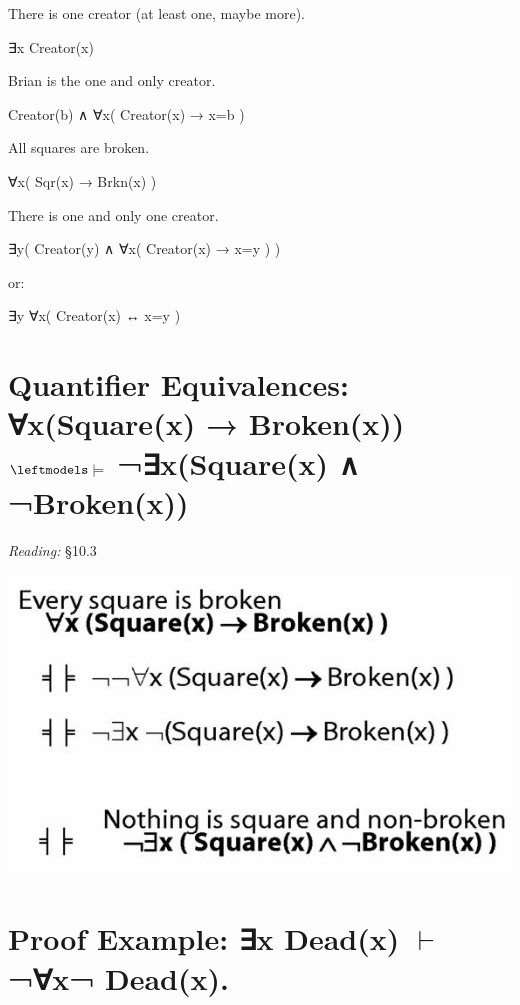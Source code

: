 \documentclass[12pt]{extarticle}
\begin{document}
\begin{multicols*}{3}
There is one creator (at least one, maybe more).
 
\hspace{3mm} ∃x Creator(x)
 
Brian is the one and only creator.
 
\hspace{3mm} Creator(b) ∧ ∀x( Creator(x) → x=b )
 
All squares are broken.
 
\hspace{3mm} ∀x( Sqr(x) → Brkn(x) )
 
There is one and only one creator.
 
\hspace{3mm} ∃y( Creator(y) ∧ ∀x( Creator(x) → x=y ) )
 
\hspace{3mm} or:
 
\hspace{3mm} ∃y ∀x( Creator(x) ↔ x=y )
 
 
 
\section{Quantifier Equivalences: ∀x(Square(x) → Broken(x)) $\leftmodels\models$ ¬∃x(Square(x) ∧ ¬Broken(x))}
 
\emph{Reading:} §10.3
 
\begin{center}
\includegraphics[scale=0.3]{img/unit_770_equiv_chain.png}
\end{center}
 
 
\section{Proof Example: ∃x Dead(x) $\vdash$ ¬∀x¬ Dead(x).}
 

\end{multicols*}
\end{document}
